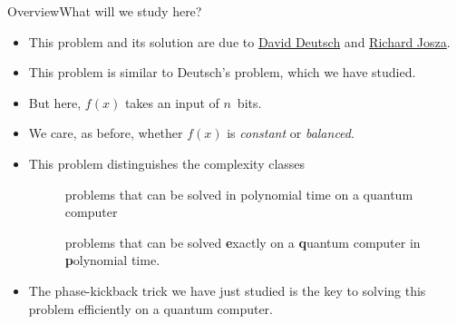 
\begin{frame}{Overview}{What will we study here?}

\begin{itemize}[<+->]
    \item This problem and its solution are due to
    \href{https://en.wikipedia.org/wiki/David_Deutsch}{David Deutsch} and \href{https://en.wikipedia.org/wiki/Richard_Jozsa}{Richard Josza}.
    \item This problem is similar to Deutsch's problem, which we have studied.
    \item But here, $f(x)$ takes an input of $n$~bits.
    \item We care, as before, whether $f(x)$ is \emph{constant} or \emph{balanced}.
    \item This problem distinguishes the complexity classes
    \begin{description}
        \item[\href{https://complexityzoo.net/Complexity_Zoo:P}{}] problems that can be solved in polynomial time on a quantum computer
        \item[\href{https://complexityzoo.net/Complexity_Zoo:E\#eqp}{}] problems that can be solved \textbf{e}xactly on a \textbf{q}uantum computer in \textbf{p}olynomial time.
    \end{description}
    \item The phase-kickback trick we have just studied is the key to solving this problem efficiently on a quantum computer.
\end{itemize}
    
\end{frame}

